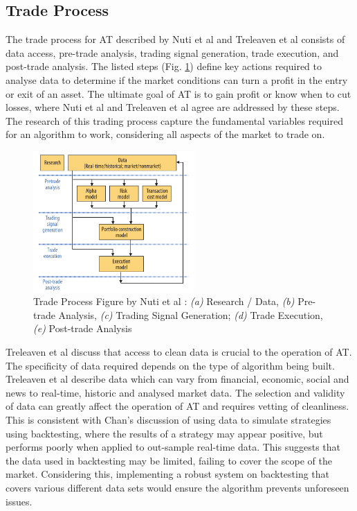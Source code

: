 \subsection{Trade Process}
\label{sec:related:algoTrading:tradeprocess}
\noindent The trade process for AT described by Nuti et al \cite{ART:Nuti:2011} and Treleaven et al  \cite{ART:Treleaven:2013} consists of data access, pre-trade analysis, trading signal generation, trade execution, and post-trade analysis. The listed steps (Fig. \ref{fig:related:tradeprocess}) define key actions required to analyse data to determine if the market conditions can turn a profit in the entry or exit of an asset. The ultimate goal of AT is to gain profit or know when to cut losses, where Nuti et al \cite{ART:Nuti:2011} and Treleaven et al  \cite{ART:Treleaven:2013} agree are addressed by these steps. The research of this trading process capture the fundamental variables required for an algorithm to work, considering all aspects of the market to trade on.

\begin{figure}[htb]
    \centering
	\includegraphics[width=0.55\textwidth]{content/graphics/AT-trade_process}
	\caption{Trade Process Figure by Nuti et al \cite{ART:Nuti:2011}: \textit{(a)} Research / Data, \textit{(b)} Pre-trade Analysis, \textit{(c)} Trading Signal Generation; \textit{(d)} Trade Execution, \textit{(e)} Post-trade Analysis }
	\label{fig:related:tradeprocess}
\end{figure}

Treleaven et al \cite{ART:Treleaven:2013} discuss that access to clean data is crucial to the operation of AT. The specificity of data required depends on the type of algorithm being built. Treleaven et al describe data which can vary from financial, economic, social and news to real-time, historic and analysed market data. The selection and validity of data can greatly affect the operation of AT and requires vetting of cleanliness. This is consistent with Chan's \cite{BOOK:Chan:2013}  discussion of using data to simulate strategies using backtesting, where the results of a strategy may appear positive, but performs poorly when applied to out-sample real-time data. This suggests that the data used in backtesting may be limited, failing to cover the scope of the market. Considering this, implementing a robust system on backtesting that covers various different data sets would ensure the algorithm prevents unforeseen issues.

